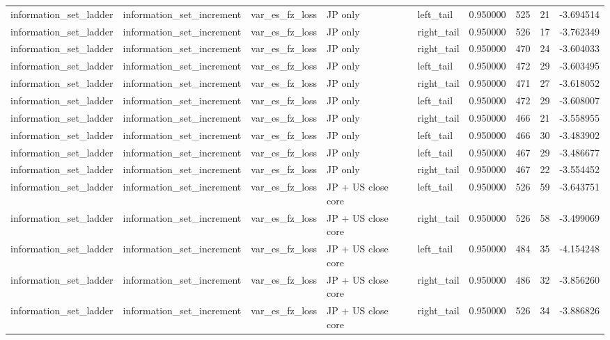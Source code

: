 \begin{tabular}{lllllrrrr}
information\_set\_ladder & information\_set\_increment & var\_es\_fz\_loss & JP only & left\_tail & 0.950000 & 525 & 21 & -3.694514 \\
information\_set\_ladder & information\_set\_increment & var\_es\_fz\_loss & JP only & right\_tail & 0.950000 & 526 & 17 & -3.762349 \\
information\_set\_ladder & information\_set\_increment & var\_es\_fz\_loss & JP only & right\_tail & 0.950000 & 470 & 24 & -3.604033 \\
information\_set\_ladder & information\_set\_increment & var\_es\_fz\_loss & JP only & left\_tail & 0.950000 & 472 & 29 & -3.603495 \\
information\_set\_ladder & information\_set\_increment & var\_es\_fz\_loss & JP only & right\_tail & 0.950000 & 471 & 27 & -3.618052 \\
information\_set\_ladder & information\_set\_increment & var\_es\_fz\_loss & JP only & left\_tail & 0.950000 & 472 & 29 & -3.608007 \\
information\_set\_ladder & information\_set\_increment & var\_es\_fz\_loss & JP only & right\_tail & 0.950000 & 466 & 21 & -3.558955 \\
information\_set\_ladder & information\_set\_increment & var\_es\_fz\_loss & JP only & left\_tail & 0.950000 & 466 & 30 & -3.483902 \\
information\_set\_ladder & information\_set\_increment & var\_es\_fz\_loss & JP only & left\_tail & 0.950000 & 467 & 29 & -3.486677 \\
information\_set\_ladder & information\_set\_increment & var\_es\_fz\_loss & JP only & right\_tail & 0.950000 & 467 & 22 & -3.554452 \\
information\_set\_ladder & information\_set\_increment & var\_es\_fz\_loss & JP + US close core & left\_tail & 0.950000 & 526 & 59 & -3.643751 \\
information\_set\_ladder & information\_set\_increment & var\_es\_fz\_loss & JP + US close core & right\_tail & 0.950000 & 526 & 58 & -3.499069 \\
information\_set\_ladder & information\_set\_increment & var\_es\_fz\_loss & JP + US close core & left\_tail & 0.950000 & 484 & 35 & -4.154248 \\
information\_set\_ladder & information\_set\_increment & var\_es\_fz\_loss & JP + US close core & right\_tail & 0.950000 & 486 & 32 & -3.856260 \\
information\_set\_ladder & information\_set\_increment & var\_es\_fz\_loss & JP + US close core & right\_tail & 0.950000 & 526 & 34 & -3.886826 \\

\end{tabular}
